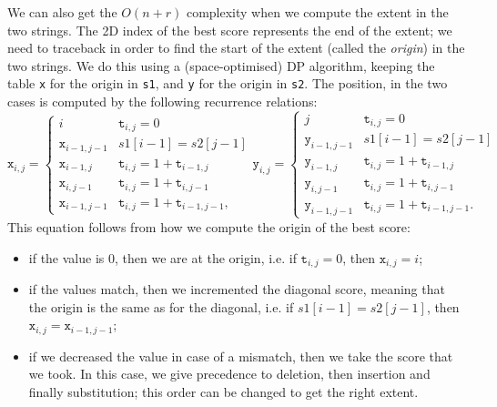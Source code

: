 \documentclass[a4paper, openany]{memoir}
\begin{document}
    We can also get the $O(n+r)$ complexity when we compute the extent in the two strings. The 2D index of the best score represents the end of the extent; we need to traceback in order to find the start of the extent (called the \emph{origin}) in the two strings. We do this using a (space-optimised) DP algorithm, keeping the table \texttt{x} for the origin in \texttt{s1}, and \texttt{y} for the origin in \texttt{s2}. The position, in the two cases is computed by the following recurrence relations:
\[\texttt{x}_{i, j} = \begin{cases}
    i & \texttt{t}_{i, j} = 0 \\
    \texttt{x}_{i-1, j-1} & s1[i-1] = s2[j-1] \\
    \texttt{x}_{i-1, j} & \texttt{t}_{i, j} = 1 + \texttt{t}_{i-1, j} \\
    \texttt{x}_{i, j-1} & \texttt{t}_{i, j} = 1 + \texttt{t}_{i, j-1} \\
    \texttt{x}_{i-1, j-1} & \texttt{t}_{i, j} = 1 + \texttt{t}_{i-1, j-1}, 
    \end{cases}
    \texttt{y}_{i, j} =  \begin{cases}
    j & \texttt{t}_{i, j} = 0 \\
    \texttt{y}_{i-1, j-1} & s1[i-1] = s2[j-1] \\
    \texttt{y}_{i-1, j} & \texttt{t}_{i, j} = 1 + \texttt{t}_{i-1, j} \\
    \texttt{y}_{i, j-1} & \texttt{t}_{i, j} = 1 + \texttt{t}_{i, j-1} \\
    \texttt{y}_{i-1, j-1} & \texttt{t}_{i, j} = 1 + \texttt{t}_{i-1, j-1}.
\end{cases}\]
    \noindent This equation follows from how we compute the origin of the best score:
    \begin{itemize}
        \item if the value is 0, then we are at the origin, i.e. if $\texttt{t}_{i, j} = 0$, then $\texttt{x}_{i, j} = i$;
        \item if the values match, then we incremented the diagonal score, meaning that the origin is the same as for the diagonal, i.e. if $s1[i-1] = s2[j-1]$, then $\texttt{x}_{i, j} = \texttt{x}_{i-1, j-1}$;
        \item if we decreased the value in case of a mismatch, then we take the score that we took. In this case, we give precedence to deletion, then insertion and finally substitution; this order can be changed to get the right extent.
    \end{itemize}
\end{document}
